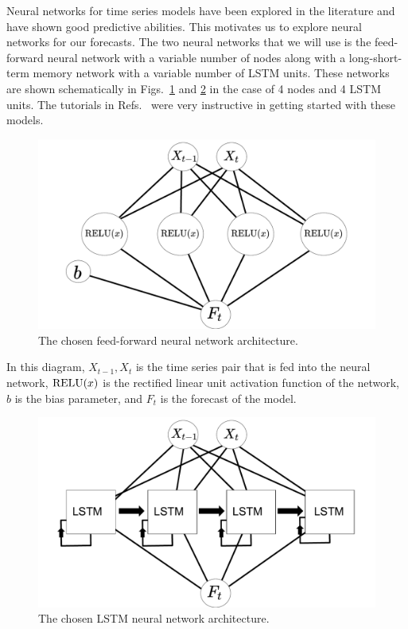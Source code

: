 \documentclass[10pt,a4paper]{article}
\begin{document}
Neural networks for time series models have been explored in the literature  \cite{Adhikari_2013,Oancea_2014,Chaudhuri_2016} and have shown good predictive abilities. This motivates us to explore neural networks for our forecasts. The two neural networks that we will use is the feed-forward neural network with a variable number of nodes along with a long-short-term memory network with a variable number of LSTM units. These networks are shown schematically in Figs.~\ref{fig:FFNN architecture} and \ref{fig:LSTM architecture} in the case of 4 nodes and 4 LSTM units. The tutorials in Refs.~\cite{Acatay_2017,Pant_2018,Vincent_2018} were very instructive in getting started with these models.
\begin{figure}[h]
\begin{center}
\includegraphics[scale=0.4]{Neural_net_schematic_FFNN.pdf}
\caption{The chosen feed-forward neural network architecture.}
\label{fig:FFNN architecture}
\centering
\end{center}
\end{figure}
In this diagram, ${X_{t-1},X_{t}}$ is the time series pair that is fed into the neural network, ${\rm RELU}(x)$ is the rectified linear unit activation function of the network, $b$ is the bias parameter, and $F_{t}$ is the forecast of the model.
\begin{figure}[h]
\begin{center}
\includegraphics[scale=0.4]{Neural_net_schematic_LSTM.pdf}
\caption{The chosen LSTM neural network architecture.}
\label{fig:LSTM architecture}
\centering
\end{center}
\end{figure}
\end{document}
